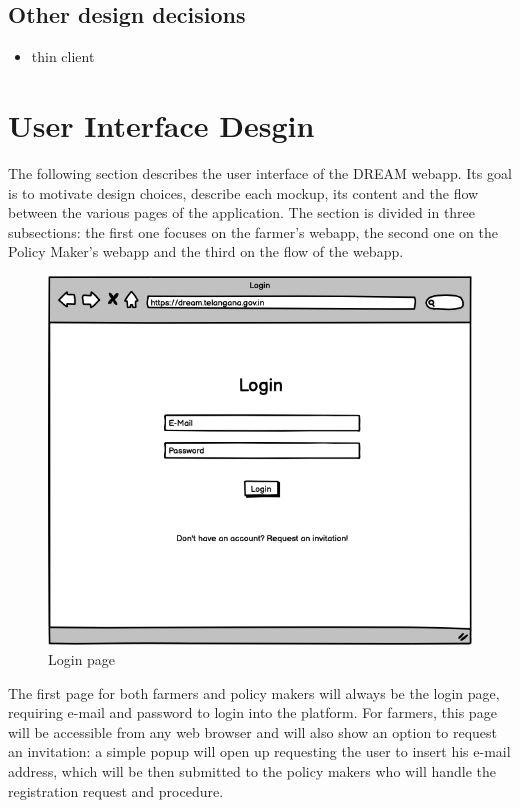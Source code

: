 \documentclass[10pt]{article} %
\begin{document}
\subsection{Other design decisions}
\begin{itemize}
    \item thin client
\end{itemize}
\section{User Interface Desgin} %
The following section describes the user interface of the DREAM webapp. Its goal is to motivate design choices, 
describe each mockup, its content and the flow between the various pages of the application.
The section is divided in three subsections: the first one focuses on the farmer's webapp, the second one on the Policy Maker's webapp
and the third on the flow of the webapp.\\
\begin{figure}[h]
    \centering
    \includegraphics[scale=0.4]{images/uimockups/login.png}
    \caption{Login page}
    \label{fig:ui_login}
\end{figure}
The first page for both farmers and policy makers will always be the login page, requiring e-mail and password to login into the platform.
For farmers, this page will be accessible from any web browser and will also show an option to request an invitation: a simple popup will open up requesting
the user to insert his e-mail address, which will be then submitted to the policy makers who will handle the registration request and procedure.
\end{document}
